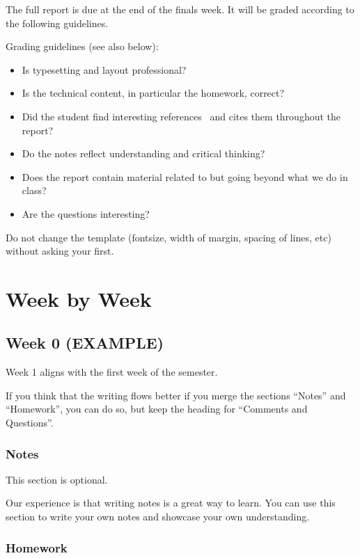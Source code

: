 \documentclass{article}
\theoremstyle{theorem}
\theoremstyle{definition}
\theoremstyle{remark}
\begin{document}
The full report is due at the end of the finals week. It will be graded according to the following guidelines.

Grading  guidelines (see also below):
\begin{itemize}
\item Is typesetting and layout professional? 
\item Is the technical content, in particular the homework, correct?
\item Did the student find interesting references~\cite{bla} and cites them throughout the report?
\item Do the notes reflect understanding and critical thinking?
\item Does the report contain material related to but going beyond what we do in class?
\item Are the questions interesting?
\end{itemize}

Do not change the template (fontsize, width of margin, spacing of lines, etc) without asking your first.

\section{Week by Week}\label{homework}

\subsection{Week 0 (EXAMPLE)}

Week 1 aligns with the first week of the semester. 

If you think that the writing flows better if you merge the sections ``Notes'' and ``Homework'', you can do so, but keep the heading for ``Comments and Questions''.

\subsubsection{Notes}

This section is optional. 

Our experience is that writing notes is a great way to learn. You can use this section to write your own notes and showcase your own understanding. 

\subsubsection{Homework}
\end{document}
